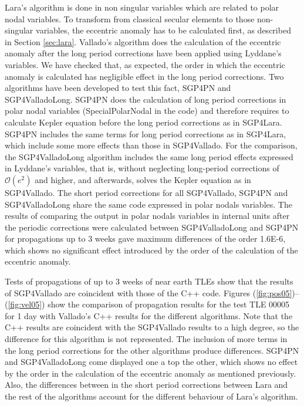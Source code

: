 \documentclass{article}
\begin{document}
Lara's algorithm is done in non singular variables which are related to polar nodal variables.
To transform from classical secular elements to those non-singular variables, the eccentric anomaly has to be calculated first, as described in Section \ref{sec:lara}.
Vallado's algorithm does the calculation of the eccentric anomaly after the long period corrections have been applied using Lyddane's variables.
We have checked that, as expected, the order in which the eccentric anomaly is calculated has negligible effect in the long period corrections.
Two algorithms have been developed to test this fact, SGP4PN and SGP4ValladoLong.
SGP4PN does the calculation of long period corrections in polar nodal variables (SpecialPolarNodal in the code) and therefore requires
to calculate Kepler equation before the long period corrections as in SGP4Lara. SGP4PN includes the same terms for long period corrections as in SGP4Lara,
which include some more effects than those in SGP4Vallado. For the comparison, the SGP4ValladoLong algorithm includes the same long period effects expressed
in Lyddane's variables, that is, without neglecting long-period corrections of $\mathcal{O}(e^2)$ and higher, and afterwards, solves the Kepler equation as in SGP4Vallado.
The short period corrections for all SGP4Vallado, SGP4PN and SGP4ValladoLong share the same code expressed in polar nodals variables.
The results of comparing the output in polar nodals variables in internal units after the periodic corrections were calculated between SGP4ValladoLong and SGP4PN for propagations up to 3 weeks
gave maximum differences of the order 1.6E-6, which shows no significant effect introduced by the order of the calculation of the eccentric anomaly.

Tests of propagations of up to 3 weeks
of near earth TLEs show that the results of SGP4Vallado are coincident with those of the C++ code.
Figures (\ref{fig:pos05})--(\ref{fig:vel05}) show the comparison of propagation results for the test TLE 00005 for 1 day with Vallado's C++ results for the different algorithms.
Note that the C++ results are coincident with the SGP4Vallado results to a high degree, so the difference for this
algorithm is not represented.
The inclusion of more terms in the long period corrections for the other algorithms produce differences.
SGP4PN and SGP4ValladoLong come displayed one a top the other, which shows no effect by the order in the calculation of the eccentric anomaly as mentioned previously.
Also, the differences between in the short period corrections between Lara and the rest of the algorithms account for the different behaviour of Lara's algorithm.
\end{document}
